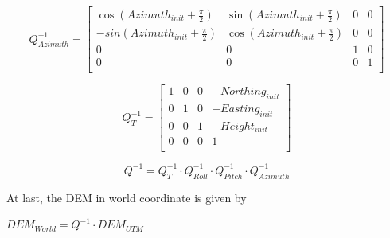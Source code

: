 \begin{equation}
Q_{Azimuth}^{-1}=\begin{bmatrix}
\cos (Azimuth_{init}+\frac{\pi }{2}) & \sin (Azimuth_{init}+\frac{\pi 
}{2}) & 0 & 0\\
-sin(Azimuth_{init}+\frac{\pi }{2}) & \cos (Azimuth_{init}+\frac{\pi 
}{2}) & 0 & 0 \\
0 & 0 & 1 & 0 \\
0 & 0 & 0 & 1 \\
\end{bmatrix}
\end{equation}


\begin{equation}
Q_{T}^{-1}=\begin{bmatrix}
1 & 0 & 0 & -Northing_{init} \\
0 & 1 & 0 & -Easting_{init} \\
0 & 0 & 1 & -Height_{init} \\
0 & 0 & 0 & 1 \\
\end{bmatrix}
\end{equation}

\begin{equation}
Q^{-1}=Q_{T}^{-1}\cdot Q_{Roll}^{-1}\cdot Q_{Pitch}^{-1}\cdot Q_{Azimuth}^{-1}
\end{equation}

At last, the DEM in world coordinate is given by

$DEM_{World}=Q^{-1}\cdot DEM_{UTM}$


